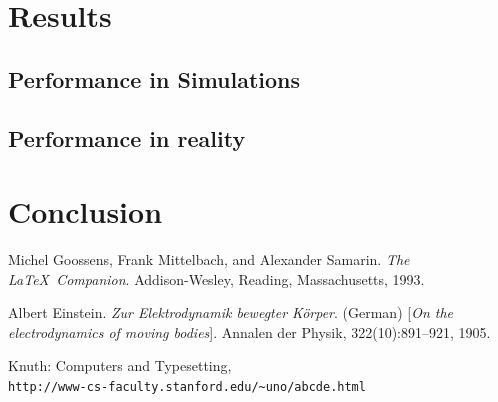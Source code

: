\documentclass{article}
\begin{document}
\section{Results}
\subsection{Performance in Simulations}
\subsection{Performance in reality}

\section{Conclusion}

\begin{thebibliography}{9}
Michel Goossens, Frank Mittelbach, and Alexander Samarin. 
\textit{The \LaTeX\ Companion}. 
Addison-Wesley, Reading, Massachusetts, 1993.
 
Albert Einstein. 
\textit{Zur Elektrodynamik bewegter K{\"o}rper}. (German) 
[\textit{On the electrodynamics of moving bodies}]. 
Annalen der Physik, 322(10):891–921, 1905.
 
Knuth: Computers and Typesetting,
\\\texttt{http://www-cs-faculty.stanford.edu/\~{}uno/abcde.html}
\end{thebibliography}
\end{document}
